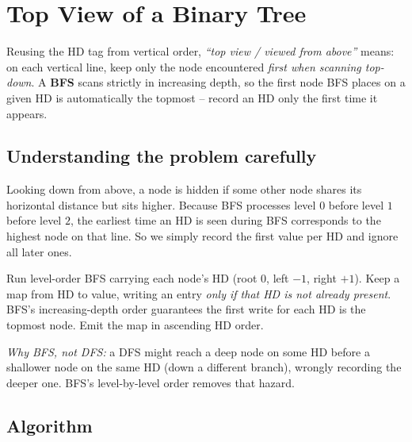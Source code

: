 \section{Top View of a Binary Tree}
\label{sec:trees-top-view}


\begin{patternbox}
Reusing the HD tag from vertical order, \emph{``top view / viewed from
above''} means: on each vertical line, keep only the node encountered
\emph{first when scanning top-down}. A \textbf{BFS} scans strictly in
increasing depth, so the first node BFS places on a given HD is
automatically the topmost -- record an HD only the first time it appears.
\end{patternbox}

\subsection*{Understanding the problem carefully}

Looking down from above, a node is hidden if some other node shares its
horizontal distance but sits higher. Because BFS processes level $0$
before level $1$ before level $2$, the earliest time an HD is seen during
BFS corresponds to the highest node on that line. So we simply record the
first value per HD and ignore all later ones.

\begin{ideabox}
Run level-order BFS carrying each node's HD (root $0$, left $-1$, right
$+1$). Keep a map from HD to value, writing an entry \emph{only if that HD
is not already present}. BFS's increasing-depth order guarantees the first
write for each HD is the topmost node. Emit the map in ascending HD order.
\end{ideabox}

\emph{Why BFS, not DFS:} a DFS might reach a deep node on some HD before a
shallower node on the same HD (down a different branch), wrongly recording
the deeper one. BFS's level-by-level order removes that hazard.

\subsection*{Algorithm}


